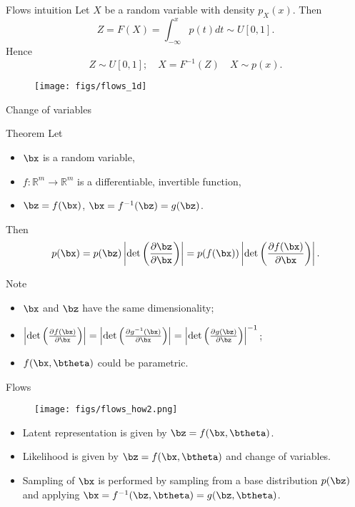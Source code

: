 \begin{frame}{Flows intuition}
	Let $X$ be a random variable with density $p_X(x)$. Then
	\[
	Z = F(X) = \int_{-\infty}^x p(t)dt \sim U[0, 1].
	\]
	Hence
	\[
	Z \sim U[0, 1]; \quad X = F^{-1}(Z) \quad X \sim p(x).
	\]
	\begin{figure}
		\texttt{[image: figs/flows\_1d]}
	\end{figure}
	
\end{frame}

\begin{frame}{Change of variables}
	\begin{block}{Theorem}
		Let 
		\begin{itemize}
			\item $\bx$ is a random variable, 
			\item $f: \mathbb{R}^m \rightarrow \mathbb{R}^m$ is a differentiable, invertible function,
			\item $\bz = f(\bx)$, $\bx = f^{-1}(\bz) = g(\bz)$.
		\end{itemize}
		Then
		\[
		p(\bx) = p(\bz) \left|\det \left(  \frac{\partial \bz}{\partial \bx} \right) \right| = p(f(\bx)) \left|\det \left(  \frac{\partial f(\bx)}{\partial \bx} \right) \right|.
		\]
	\end{block}
	\begin{block}{Note}
		\begin{itemize}
			\item $\bx$ and $\bz$ have the same dimensionality;
			\item $ \left|\det \left(  \frac{\partial f(\bx)}{\partial \bx} \right)\right| = \left|\det \left(  \frac{\partial g^{-1}(\bx)}{\partial \bx} \right)\right| = \left|\det \left(  \frac{\partial g(\bz)}{\partial \bz} \right)\right|^{-1}$;
			\item $f(\bx, \btheta)$ could be parametric.
		\end{itemize}
	\end{block}
\end{frame}
\begin{frame}{Flows}
\begin{figure}
	\texttt{[image: figs/flows\_how2.png]}
\end{figure}
\begin{itemize}	
	\item Latent representation is given by $\bz = f(\bx, \btheta)$.
	\item Likelihood is given by $\bz = f(\bx, \btheta)$ and change of variables.
	\item Sampling of $\bx$ is performed by sampling from a base distribution $p(\bz)$ and applying $\bx = f^{-1}(\bz, \btheta) = g(\bz, \btheta)$.
\end{itemize}
\end{frame}
